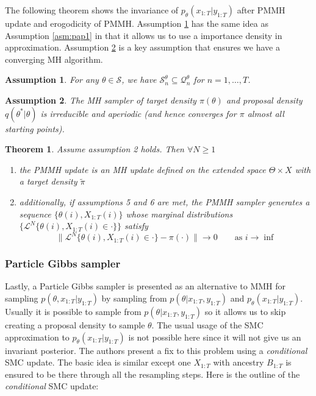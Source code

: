 \documentclass{article}\usepackage[]{graphicx}\usepackage[]{color}
\newtheorem{assumption}{Assumption}
\newtheorem{theorem}{Theorem}
\theoremstyle{definition}
\begin{document}
The following theorem shows the invariance of $p_\theta(x_{1:T}|y_{1:T})$ after PMMH update and erogodicity of PMMH. Assumption \ref{asm:pap5} has the same idea as Assumption \ref{asm:pap1} in that it allows us to use a importance density in approximation. Assumption \ref{asm:pap6} is a key assumption that ensures we have a converging MH algorithm.

\begin{assumption}\label{asm:pap5}
For any $\theta \in \mathcal{S}$, we have $\mathcal{S}^\theta_n \subseteq \mathcal{Q}^\theta_n$ for $n=1,\ldots,T$.
\end{assumption}

\begin{assumption}\label{asm:pap6}
The MH sampler of target density $\pi(\theta)$ and proposal density $q(\theta^*|\theta)$ is irreducible and aperiodic (and hence converges for $\pi$ almost all starting points).
\end{assumption}

\begin{theorem}
Assume assumption 2 holds. Then $\forall N \geq 1$
\begin{enumerate}
  \item the PMMH update is an MH update defined on the extended space $\Theta \times X$ with a target density $\tilde{\pi}$
  \item additionally, if assumptions 5 and 6 are met, the PMMH sampler generates a sequence $\{ \theta(i), X_{1:T}(i) \}$ whose marginal distributions $\{ \mathcal{L}^N \{ \theta(i), X_{1:T}(i) \in \cdot \} \}$ satisfy 
    \begin{equation*}
    \| \mathcal{L}^N \{ \theta(i), X_{1:T}(i) \in \cdot \} - \pi(\cdot) \| \rightarrow 0 \quad \quad \text{as }i \rightarrow \inf
    \end{equation*}
\end{enumerate}
\end{theorem}



\subsubsection{Particle Gibbs sampler}
Lastly, a Particle Gibbs sampler is presented as an alternative to MMH for sampling $p(\theta, x_{1:T}|y_{1:T})$ by sampling from $p(\theta|x_{1:T},y_{1:T})$ and $p_\theta(x_{1:T}|y_{1:T})$. Usually it is possible to sample from $p(\theta|x_{1:T},y_{1:T})$ so it allows us to skip creating a proposal density to sample $\theta$. The usual usage of the SMC approximation to $p_\theta(x_{1:T}|y_{1:T})$ is not possible here since it will not give us an invariant posterior. The authors present a fix to this problem using a \textit{conditional} SMC update. The basic idea is similar except one $X_{1:T}$ with ancestry $B_{1:T}$ is ensured to be there through all the resampling steps. Here is the outline of the \textit{conditional} SMC update:
\end{document}
